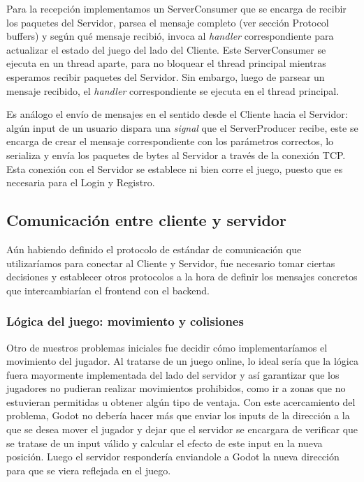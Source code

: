 Para la recepción implementamos un ServerConsumer que se encarga de recibir los paquetes 
del Servidor, parsea el mensaje completo (ver sección Protocol buffers) y según qué mensaje recibió, 
invoca al \textit{handler} correspondiente para actualizar el estado del juego del lado del Cliente.
Este ServerConsumer se ejecuta en un thread aparte, para no bloquear el thread principal mientras
esperamos recibir paquetes del Servidor. Sin embargo, luego de parsear un mensaje recibido, el \textit{handler}
correspondiente se ejecuta en el thread principal.

Es análogo el envío de mensajes en el sentido desde el Cliente hacia el Servidor: algún input de un 
usuario dispara una \textit{signal} que el ServerProducer recibe, este se encarga de crear 
el mensaje correspondiente con los parámetros correctos, lo serializa y envía los paquetes de bytes 
al Servidor a través de la conexión TCP.
Esta conexión con el Servidor se establece ni bien corre el juego, puesto que es necesaria para el Login y Registro.

\subsection{Comunicación entre cliente y servidor}
Aún habiendo definido el protocolo de estándar de comunicación que utilizaríamos para conectar al Cliente y Servidor,
fue necesario tomar ciertas decisiones y establecer otros protocolos a la hora de definir los mensajes
concretos que intercambiarían el frontend con el backend.

\subsubsection{Lógica del juego: movimiento y colisiones}
\noindent Otro de nuestros problemas iniciales fue decidir cómo implementaríamos el movimiento del 
jugador. Al tratarse de un juego online, lo ideal sería que la lógica fuera mayormente implementada del 
lado del servidor y así garantizar que los jugadores no pudieran realizar movimientos prohibidos, como 
ir a zonas que no estuvieran permitidas u obtener algún tipo de ventaja. Con este acercamiento del 
problema, Godot no debería hacer más que enviar los inputs de la dirección a la que se desea mover el 
jugador y dejar que el servidor se encargara de verificar que se tratase de un input válido y calcular 
el efecto de este input en la nueva posición. Luego el servidor respondería enviandole a Godot la nueva
dirección para que se viera reflejada en el juego.


